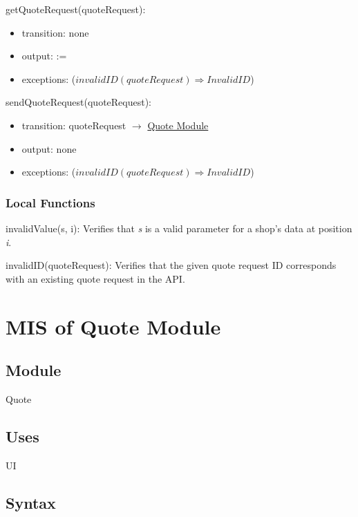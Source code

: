 \documentclass[12pt, titlepage]{article}
\begin{document}
\noindent getQuoteRequest(quoteRequest):
\begin{itemize}
\item transition: none
\item output:  := 
\item exceptions: ($invalidID(quoteRequest) \Rightarrow InvalidID$)
\end{itemize}

\noindent sendQuoteRequest(quoteRequest):
\begin{itemize}
\item transition: quoteRequest $\rightarrow$ \hyperref[mQuote]{Quote Module}
\item output: none
\item exceptions: ($invalidID(quoteRequest) \Rightarrow InvalidID$)
\end{itemize}

\subsubsection{Local Functions}

\noindent invalidValue(s, i): Verifies that \textit{s} is a valid parameter for a shop's data at position \textit{i}.

\noindent invalidID(quoteRequest): Verifies that the given quote request ID corresponds with an existing quote request in the API.

\newpage

\section{MIS of Quote Module} \label{mQuote} 

\subsection{Module}

Quote

\subsection{Uses}

UI

\subsection{Syntax}
\end{document}
